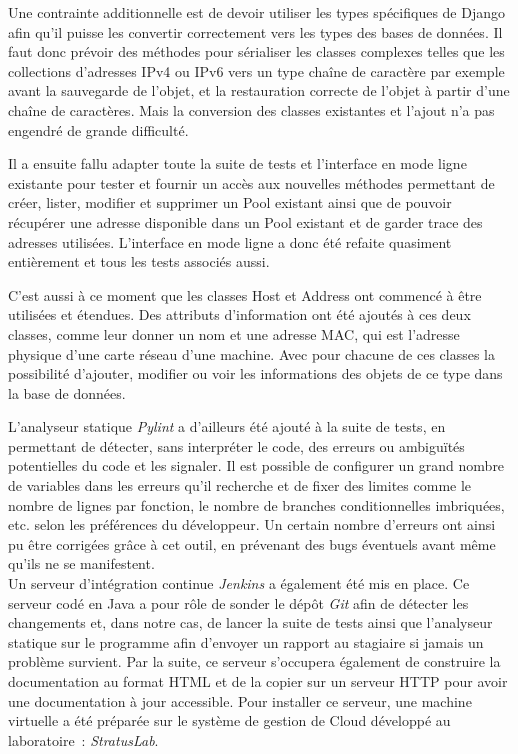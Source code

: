 \documentclass[12pt,a4paper,twoside]{report}
\begin{document}
Une contrainte additionnelle est de devoir utiliser les types spécifiques de
Django afin qu’il puisse les convertir correctement vers les types des bases de
données. Il faut donc prévoir des méthodes pour sérialiser les classes
complexes telles que les collections d’adresses IPv4 ou IPv6 vers un type
chaîne de caractère par exemple avant la sauvegarde de l’objet, et la
restauration correcte de l’objet à partir d’une chaîne de caractères. Mais la
conversion des classes existantes et l’ajout n’a pas engendré de grande
difficulté.

Il a ensuite fallu adapter toute la suite de tests et l’interface en mode
ligne existante pour tester et fournir un accès aux nouvelles méthodes
permettant de créer, lister, modifier et supprimer un Pool existant ainsi que
de pouvoir récupérer une adresse disponible dans un Pool existant et de garder
trace des adresses utilisées. L’interface en mode ligne a donc été refaite
quasiment entièrement et tous les tests associés aussi.

C’est aussi à ce moment que les classes Host et Address ont commencé à être
utilisées et étendues. Des attributs d’information ont été ajoutés à ces deux
classes, comme leur donner un nom et une adresse MAC, qui est l’adresse
physique d’une carte réseau d’une machine. Avec pour chacune de ces classes la
possibilité d’ajouter, modifier ou voir les informations des objets de ce type
dans la base de données.

L’analyseur statique \emph{Pylint} a d’ailleurs été ajouté à la suite de tests,
en permettant de détecter, sans interpréter le code, des erreurs ou ambiguïtés
potentielles du code et les signaler. Il est possible de configurer un grand
nombre de variables dans les erreurs qu’il recherche et de fixer des limites
comme le nombre de lignes par fonction, le nombre de branches conditionnelles
imbriquées, etc. selon les préférences du développeur. Un certain nombre
d’erreurs ont ainsi pu être corrigées grâce à cet outil, en prévenant des bugs
éventuels avant même qu’ils ne se manifestent.\\

Un serveur d’intégration continue \emph{Jenkins} a également été mis en place.
Ce serveur codé en Java a pour rôle de sonder le dépôt \emph{Git} afin de
détecter les changements et, dans notre cas, de lancer la suite de tests ainsi
que l’analyseur statique sur le programme afin d’envoyer un rapport au
stagiaire si jamais un problème survient. Par la suite, ce serveur s’occupera
également de construire la documentation au format HTML et de la copier sur un
serveur HTTP pour avoir une documentation à jour accessible. Pour installer ce
serveur, une machine virtuelle a été préparée sur le système de gestion de
Cloud développé au laboratoire~: \emph{StratusLab}.
\end{document}

